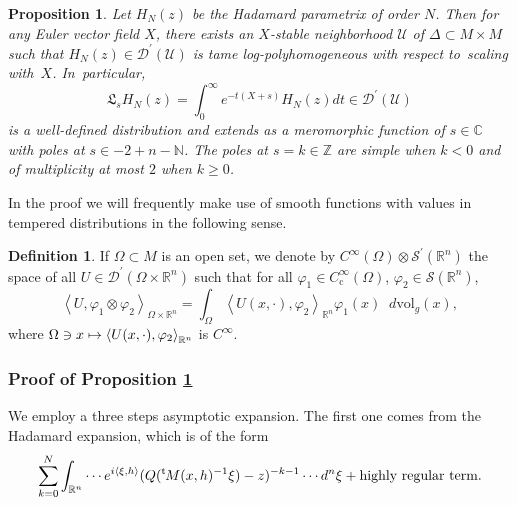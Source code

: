 \documentclass[JEP,XML,SOM,Unicode]{cedram}
\let\pazocal\mathscr
\def\mto{\mathchoice{\longmapsto}{\mapsto}{\mapsto}{\mapsto}}
\newtheorem{proposition}[theorem]{Proposition}
\theoremstyle{definition}
\newtheorem{definition}[theorem]{Definition}
\renewcommand\c{\mathrm{c}}
\let\euler X
\newcommand\dvol{\mathop{}\!d\mathrm{vol}}
\renewcommand{\t}{{{}^{\mathrm{t}\mkern-2mu}}}
\begin{document}
\begin{proposition}\label{prop:feynmanlog}
Let $H_N(z)$ be the Hadamard parametrix of order $N$. Then for any Euler vector field $\euler$, there exists an $\euler$-stable neighborhood $\pazocal{U}$ of $\Delta\subset M\times M$ such that $H_N(z)\in \pazocal{D}^\prime(\pazocal{U})$
is tame log-polyhomogeneous with respect to~scaling with~$\euler$.
In~particular,
\[
\mathfrak{L}_s H_N(z)= \int_0^\infty e^{-t(\euler+s)}H_N(z) dt \in \pazocal{D}^\prime(\pazocal{U})
\]
is a well-defined distribution and extends as a \emph{meromorphic function} of $s\in \mathbb{C}$
with poles at {$s\in -2+n-\mathbb{N}$}. The poles at {$s=k\in \mathbb{Z}$} are simple when $k<0$ and of multiplicity {at most} $2$ when $k\geqslant 0$.
\end{proposition}

In the proof we will frequently make use of smooth functions with values in tempered distributions in the following sense.

\begin{definition}\label{d:smoothfunctionsvaluedindistributions}
If $\Omega \subset M$ is an open set, we denote by $C^\infty(\Omega)\otimes \pazocal{S}^\prime(\mathbb{R}^n)$ the space of all $U\in \pazocal{D}^\prime(\Omega\times \mathbb{R}^n)$ such that
for all $\varphi_1\in C^\infty_\c(\Omega)$, $\varphi_2\in \pazocal{S}(\mathbb{R}^n)$,
\[
\left\langle U,\varphi_1\otimes \varphi_2 \right\rangle_{\Omega\times \mathbb{R}^n}=
\int_\Omega \left\langle U(x,\cdot),\varphi_2\right\rangle_{\mathbb{R}^n} \varphi_1(x)\dvol_g(x),
\]
where $\Omega \ni x\mto \left\langle U(x,\cdot),\varphi_2\right\rangle_{\mathbb{R}^n}$ is $C^\infty$.
\end{definition}

\subsubsection*{Proof of Proposition \ref{prop:feynmanlog}} We employ a three steps asymptotic expansion. The first one comes from the Hadamard expansion, which is of the form
\[
\sum_{k=0}^N \int_{\mathbb{R}^n} \cdots e^{i\left\langle\xi,h\right\rangle} (Q(\t M(x,h)^{-1}\xi)-z)^{-k-1} \cdots d^n\xi +\text{highly regular term}.
\]
\end{document}
